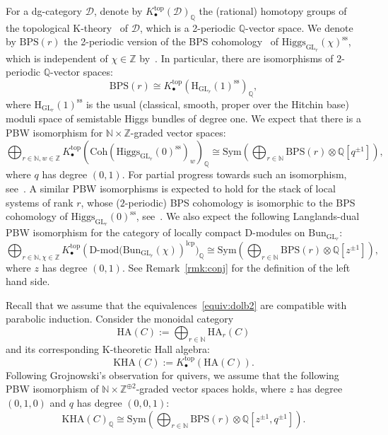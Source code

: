 \documentclass [11pt,oneside,a4paper,mathscr]{amsart}
\theoremstyle{definition}
\newcommand{\GL}{\operatorname{GL}}
\newcommand{\Hig}{\mathrm{Higgs}}
\newcommand{\Bun}{\mathrm{Bun}}
\begin{document}
For a dg-category $\mathscr{D}$, denote by $K^{\text{top}}_\bullet(\mathscr{D})_\mathbb{Q}$ the (rational) homotopy groups of the topological K-theory~\cite{Blanc} of $\mathscr{D}$, which is a 2-periodic $\mathbb{Q}$-vector space. 
We denote by $\mathrm{BPS}(r)$ the 2-periodic version of the BPS cohomology~\cite{DM, KinjoKoseki} of $\Hig_{\GL_r}(\chi)^{\text{ss}}$, which is independent of $\chi\in \mathbb{Z}$ by~\cite{KinjoKoseki}. In particular, there are isomorphisms of $2$-periodic $\mathbb{Q}$-vector spaces:
\[\text{BPS}(r)\cong K^{\text{top}}_\bullet(\text{H}_{\mathrm{GL}_r}(1)^{\text{ss}})_\mathbb{Q},\] where $\text{H}_{\mathrm{GL}_r}(1)^{\text{ss}}$ is the usual (classical, smooth, proper over the Hitchin base) moduli space of semistable Higgs bundles of degree one. 
We expect that there is a PBW isomorphism for $\mathbb{N}\times\mathbb{Z}$-graded vector spaces:
\[\bigoplus_{r\in \mathbb{N}, w\in\mathbb{Z}}K_\bullet^{\text{top}}\left(\mathrm{Coh}(\Hig_{\GL_r}(0)^{\text{ss}})_w\right)_\mathbb{Q}\cong \mathrm{Sym}\left(\bigoplus_{r\in\mathbb{N}}\mathrm{BPS}(r)\otimes \mathbb{Q}[q^{\pm 1}]\right),\] where $q$ has degree $(0,1)$. For partial progress towards such an isomorphism, see~\cite{PThiggs2}.
A similar PBW isomorphisms is expected to hold for the stack of local systems of rank $r$, whose ($2$-periodic) BPS cohomology is isomorphic to the BPS cohomology of $\Hig_{\mathrm{GL}_r}(0)^{\text{ss}}$, see~\cite{Henn}. 
We also expect the following Langlands-dual PBW isomorphism for the category of locally compact D-modules on $\Bun_{\mathrm{GL}_r}$:
\[\bigoplus_{r\in \mathbb{N}, \chi\in\mathbb{Z}}K_\bullet^{\text{top}}\left(\text{D-mod}(\Bun_{\mathrm{GL}_r}(\chi)\right)^{\mathrm{lcp}})_\mathbb{Q}\cong \mathrm{Sym}\left(\bigoplus_{r\in\mathbb{N}}\mathrm{BPS}(r)\otimes \mathbb{Q}[z^{\pm 1}]\right),\] where $z$ has degree $(0,1)$. See Remark~\ref{rmk:conj} for the definition of the left hand side. 

Recall that we assume that the equivalences~\eqref{equiv:dolb2}
 are compatible with parabolic induction. 
  Consider the monoidal category 
  \begin{equation}\label{def:Hall}
  \text{HA}(C):=\bigoplus_{r\in\mathbb{N}} \text{HA}_r(C)
  \end{equation}
  and its corresponding K-theoretic Hall algebra:
  \[\mathrm{KHA}(C):=K^{\text{top}}_\bullet(\mathrm{HA}(C)).\] 
  Following Grojnowski's observation for quivers, we assume that the following PBW isomorphism of  $\mathbb{N}\times\mathbb{Z}^{\oplus 2}$-graded vector spaces holds, where $z$ has degree $(0,1,0)$ and $q$ has degree $(0,0,1)$:
  \begin{equation}\label{iso:KHAC}
  \mathrm{KHA}(C)_\mathbb{Q}\cong \mathrm{Sym}\left(\bigoplus_{r\in\mathbb{N}}\mathrm{BPS}(r)\otimes\mathbb{Q}[z^{\pm 1}, q^{\pm 1}]\right).
  \end{equation}
\end{document}
